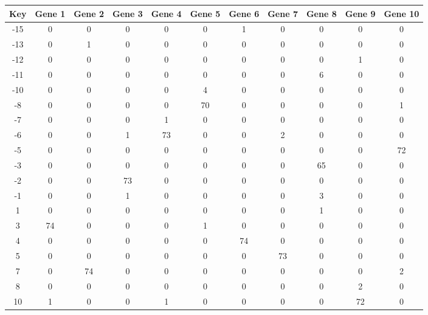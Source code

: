 \begin{tabular}{|c|c|c|c|c|c|c|c|c|c|c|}
\hline
Key & Gene 1 & Gene 2 & Gene 3 & Gene 4 & Gene 5 & Gene 6 & Gene 7 & Gene 8 & Gene 9 & Gene 10 \\
\hline
-15 & 0 & 0 & 0 & 0 & 0 & 1 & 0 & 0 & 0 & 0 \\
-13 & 0 & 1 & 0 & 0 & 0 & 0 & 0 & 0 & 0 & 0 \\
-12 & 0 & 0 & 0 & 0 & 0 & 0 & 0 & 0 & 1 & 0 \\
-11 & 0 & 0 & 0 & 0 & 0 & 0 & 0 & 6 & 0 & 0 \\
-10 & 0 & 0 & 0 & 0 & 4 & 0 & 0 & 0 & 0 & 0 \\
-8 & 0 & 0 & 0 & 0 & 70 & 0 & 0 & 0 & 0 & 1 \\
-7 & 0 & 0 & 0 & 1 & 0 & 0 & 0 & 0 & 0 & 0 \\
-6 & 0 & 0 & 1 & 73 & 0 & 0 & 2 & 0 & 0 & 0 \\
-5 & 0 & 0 & 0 & 0 & 0 & 0 & 0 & 0 & 0 & 72 \\
-3 & 0 & 0 & 0 & 0 & 0 & 0 & 0 & 65 & 0 & 0 \\
-2 & 0 & 0 & 73 & 0 & 0 & 0 & 0 & 0 & 0 & 0 \\
-1 & 0 & 0 & 1 & 0 & 0 & 0 & 0 & 3 & 0 & 0 \\
1 & 0 & 0 & 0 & 0 & 0 & 0 & 0 & 1 & 0 & 0 \\
3 & 74 & 0 & 0 & 0 & 1 & 0 & 0 & 0 & 0 & 0 \\
4 & 0 & 0 & 0 & 0 & 0 & 74 & 0 & 0 & 0 & 0 \\
5 & 0 & 0 & 0 & 0 & 0 & 0 & 73 & 0 & 0 & 0 \\
7 & 0 & 74 & 0 & 0 & 0 & 0 & 0 & 0 & 0 & 2 \\
8 & 0 & 0 & 0 & 0 & 0 & 0 & 0 & 0 & 2 & 0 \\
10 & 1 & 0 & 0 & 1 & 0 & 0 & 0 & 0 & 72 & 0 \\
\hline
\end{tabular}